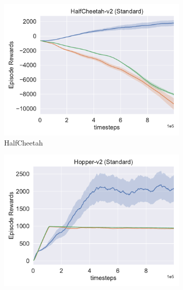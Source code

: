 \begin{figure}[h!]
\centering
  \begin{subfigure}[t]{0.49\textwidth}
    \includegraphics[width=\textwidth]{figures/chapter5/r_in_only/halfcheetah.pdf}
    \caption{HalfCheetah}
  \end{subfigure}\hfill
  \begin{subfigure}[t]{0.49\textwidth}
    \includegraphics[width=\textwidth]{figures/chapter5/r_in_only/hopper.pdf}

\end{subfigure}
\end{figure}
